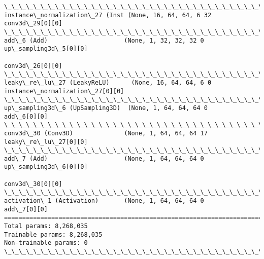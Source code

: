 \documentclass[11pt]{article}
\begin{document}
\begin{Verbatim}[commandchars=\\\{\}]
\_\_\_\_\_\_\_\_\_\_\_\_\_\_\_\_\_\_\_\_\_\_\_\_\_\_\_\_\_\_\_\_\_\_\_\_\_\_\_\_\_\_\_\_\_\_\_\_\_\_\_\_\_\_\_\_\_\_\_\_\_\_\_\_\_\_\_\_\_\_\_\_\_\_\_\_\_\_\_\_\_\_\_\_\_\_\_\_\_\_\_\_\_\_\_\_\_\_
instance\_normalization\_27 (Inst (None, 16, 64, 64, 6 32          conv3d\_29[0][0]                  
\_\_\_\_\_\_\_\_\_\_\_\_\_\_\_\_\_\_\_\_\_\_\_\_\_\_\_\_\_\_\_\_\_\_\_\_\_\_\_\_\_\_\_\_\_\_\_\_\_\_\_\_\_\_\_\_\_\_\_\_\_\_\_\_\_\_\_\_\_\_\_\_\_\_\_\_\_\_\_\_\_\_\_\_\_\_\_\_\_\_\_\_\_\_\_\_\_\_
add\_6 (Add)                     (None, 1, 32, 32, 32 0           up\_sampling3d\_5[0][0]            
                                                                 conv3d\_26[0][0]                  
\_\_\_\_\_\_\_\_\_\_\_\_\_\_\_\_\_\_\_\_\_\_\_\_\_\_\_\_\_\_\_\_\_\_\_\_\_\_\_\_\_\_\_\_\_\_\_\_\_\_\_\_\_\_\_\_\_\_\_\_\_\_\_\_\_\_\_\_\_\_\_\_\_\_\_\_\_\_\_\_\_\_\_\_\_\_\_\_\_\_\_\_\_\_\_\_\_\_
leaky\_re\_lu\_27 (LeakyReLU)      (None, 16, 64, 64, 6 0           instance\_normalization\_27[0][0]  
\_\_\_\_\_\_\_\_\_\_\_\_\_\_\_\_\_\_\_\_\_\_\_\_\_\_\_\_\_\_\_\_\_\_\_\_\_\_\_\_\_\_\_\_\_\_\_\_\_\_\_\_\_\_\_\_\_\_\_\_\_\_\_\_\_\_\_\_\_\_\_\_\_\_\_\_\_\_\_\_\_\_\_\_\_\_\_\_\_\_\_\_\_\_\_\_\_\_
up\_sampling3d\_6 (UpSampling3D)  (None, 1, 64, 64, 64 0           add\_6[0][0]                      
\_\_\_\_\_\_\_\_\_\_\_\_\_\_\_\_\_\_\_\_\_\_\_\_\_\_\_\_\_\_\_\_\_\_\_\_\_\_\_\_\_\_\_\_\_\_\_\_\_\_\_\_\_\_\_\_\_\_\_\_\_\_\_\_\_\_\_\_\_\_\_\_\_\_\_\_\_\_\_\_\_\_\_\_\_\_\_\_\_\_\_\_\_\_\_\_\_\_
conv3d\_30 (Conv3D)              (None, 1, 64, 64, 64 17          leaky\_re\_lu\_27[0][0]             
\_\_\_\_\_\_\_\_\_\_\_\_\_\_\_\_\_\_\_\_\_\_\_\_\_\_\_\_\_\_\_\_\_\_\_\_\_\_\_\_\_\_\_\_\_\_\_\_\_\_\_\_\_\_\_\_\_\_\_\_\_\_\_\_\_\_\_\_\_\_\_\_\_\_\_\_\_\_\_\_\_\_\_\_\_\_\_\_\_\_\_\_\_\_\_\_\_\_
add\_7 (Add)                     (None, 1, 64, 64, 64 0           up\_sampling3d\_6[0][0]            
                                                                 conv3d\_30[0][0]                  
\_\_\_\_\_\_\_\_\_\_\_\_\_\_\_\_\_\_\_\_\_\_\_\_\_\_\_\_\_\_\_\_\_\_\_\_\_\_\_\_\_\_\_\_\_\_\_\_\_\_\_\_\_\_\_\_\_\_\_\_\_\_\_\_\_\_\_\_\_\_\_\_\_\_\_\_\_\_\_\_\_\_\_\_\_\_\_\_\_\_\_\_\_\_\_\_\_\_
activation\_1 (Activation)       (None, 1, 64, 64, 64 0           add\_7[0][0]                      
==================================================================================================
Total params: 8,268,035
Trainable params: 8,268,035
Non-trainable params: 0
\_\_\_\_\_\_\_\_\_\_\_\_\_\_\_\_\_\_\_\_\_\_\_\_\_\_\_\_\_\_\_\_\_\_\_\_\_\_\_\_\_\_\_\_\_\_\_\_\_\_\_\_\_\_\_\_\_\_\_\_\_\_\_\_\_\_\_\_\_\_\_\_\_\_\_\_\_\_\_\_\_\_\_\_\_\_\_\_\_\_\_\_\_\_\_\_\_\_

    \end{Verbatim}


    
    
    
    
\end{document}
